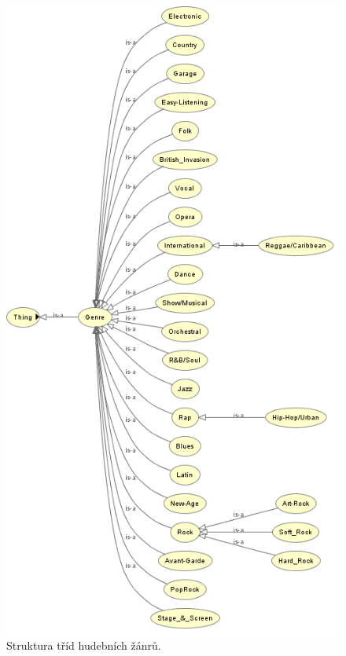 \begin{figure}[h]
\begin{center}
\includegraphics[width=13cm]{figures/mpo_genres}
\caption{Struktura tříd hudebních žánrů.}
\label{img:ontoFinalGenres}
\end{center}
\end{figure}